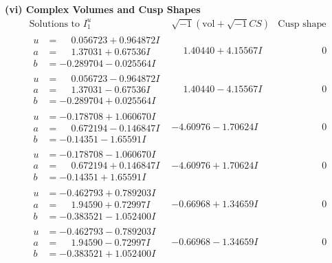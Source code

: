 \documentclass[1p]{elsarticle_modified}
\theoremstyle{definition}
\newcommand{\I}{\sqrt{-1}}
\begin{document}
\newpage\flushleft \textbf{(vi) Complex Volumes and Cusp Shapes}
$$\begin{array}{c|c|c}  
\text{Solutions to }I^u_{1}& \I (\text{vol} + \sqrt{-1}CS) & \text{Cusp shape}\\
 \hline 
\begin{aligned}
u &= \phantom{-}0.056723 + 0.964872 I \\
a &= \phantom{-}1.37031 + 0.67536 I \\
b &= -0.289704 - 0.025564 I\end{aligned}
 & \phantom{-}1.40440 + 4.15567 I & \phantom{-0.000000 } 0 \\ \hline\begin{aligned}
u &= \phantom{-}0.056723 - 0.964872 I \\
a &= \phantom{-}1.37031 - 0.67536 I \\
b &= -0.289704 + 0.025564 I\end{aligned}
 & \phantom{-}1.40440 - 4.15567 I & \phantom{-0.000000 } 0 \\ \hline\begin{aligned}
u &= -0.178708 + 1.060670 I \\
a &= \phantom{-}0.672194 - 0.146847 I \\
b &= -0.14351 - 1.65591 I\end{aligned}
 & -4.60976 - 1.70624 I & \phantom{-0.000000 } 0 \\ \hline\begin{aligned}
u &= -0.178708 - 1.060670 I \\
a &= \phantom{-}0.672194 + 0.146847 I \\
b &= -0.14351 + 1.65591 I\end{aligned}
 & -4.60976 + 1.70624 I & \phantom{-0.000000 } 0 \\ \hline\begin{aligned}
u &= -0.462793 + 0.789203 I \\
a &= \phantom{-}1.94590 + 0.72997 I \\
b &= -0.383521 - 1.052400 I\end{aligned}
 & -0.66968 + 1.34659 I & \phantom{-0.000000 } 0 \\ \hline\begin{aligned}
u &= -0.462793 - 0.789203 I \\
a &= \phantom{-}1.94590 - 0.72997 I \\
b &= -0.383521 + 1.052400 I\end{aligned}
 & -0.66968 - 1.34659 I & \phantom{-0.000000 } 0 \\ \hline\begin{aligned}

\end{aligned}
\end{array}$$
\end{document}
